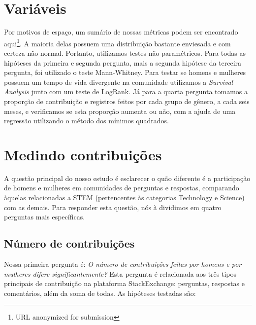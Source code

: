 

\section{Variáveis}

Por motivos de espaço, um sumário de nossas métricas podem ser encontrado aqui\footnote{URL anonymized for submission}. A maioria delas possuem uma distribuição bastante enviesada e com certeza não normal. Portanto, utilizamos testes não paramétricos. Para todas as hipóteses da primeira e segunda pergunta, mais a segunda hipótese da terceira pergunta, foi utilizado o teste Mann-Whitney. Para testar se homens e mulheres possuem um tempo de vida divergente na comunidade utilizamos a \textit{Survival Analysis} junto com um teste de LogRank. Já para a quarta pergunta tomamos a proporção de contribuição e registros feitos por cada grupo de gênero, a cada seis meses, e verificamos se esta proporção aumenta ou não, com a ajuda de uma regressão utilizando o método dos mínimos quadrados.

\section{Medindo contribuições}

A questão principal do nosso estudo é esclarecer o quão diferente é a participação de homens e mulheres em comunidades de perguntas e respostas, comparando àquelas relacionadas a STEM (pertencentes às categorias Technology e Science) com as demais. Para responder esta questão, nós à dividimos em quatro perguntas mais específicas.

\subsection{Número de contribuições}

Nossa primeira pergunta é: \textit{O número de contribuições feitas por homens e por mulheres difere significantemente?} Esta pergunta é relacionada aos três tipos principais de contribuição na plataforma StackExchange: perguntas, respostas e comentários, além da soma de todas. As hipóteses testadas são:

